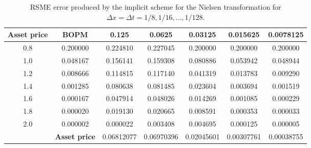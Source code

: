 \begin{table}[H]
    \centering
    \begin{tabular}{@{}ccccccc@{}}
    \toprule
    \textbf{Asset price} & \textbf{BOPM}        & 0.125      & 0.0625     & 0.03125    & 0.015625   & 0.0078125  \\ \midrule
    0.8                  & 0.200000             & 0.224810   & 0.227045   & 0.200000   & 0.200000   & 0.200000   \\
    1.0                  & 0.048167             & 0.156141   & 0.159308   & 0.080886   & 0.053942   & 0.048944   \\
    1.2                  & 0.008666             & 0.114815   & 0.117140   & 0.041319   & 0.013783   & 0.009290   \\
    1.4                  & 0.001285             & 0.080638   & 0.081485   & 0.023604   & 0.003694   & 0.001519   \\
    1.6                  & 0.000167             & 0.047914   & 0.048026   & 0.014269   & 0.001085   & 0.000229   \\
    1.8                  & 0.000020             & 0.019130   & 0.020665   & 0.008591   & 0.000353   & 0.000033   \\
    2.0                  & 0.000002             & 0.000022   & 0.003408   & 0.004695   & 0.000125   & 0.000005   \\
                         & \textbf{Asset price} & 0.06812077 & 0.06970396 & 0.02045601 & 0.00307761 & 0.00038755 \\ \bottomrule
    \end{tabular}
    \caption{RSME error produced by the implicit scheme for the Nielsen transformation for $\Delta{x}=\Delta{t}=1/8,1/16,\dots,1/128$.}
\end{table}

